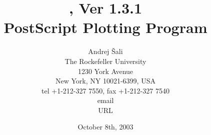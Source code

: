 \title{\vspace{3cm} \ASGL, Ver 1.3.1 \\[1cm]
       PostScript Plotting Program \\[3cm]}

\author{Andrej \v{S}ali \\[0.5cm]
The Rockefeller University  \\
1230 York Avenue \\
New York, NY 10021-6399, USA  \\
tel +1-212-327 7550, fax +1-212-327 7540  \\
email  \\
URL 
}

\date{October 8th, 2003}
